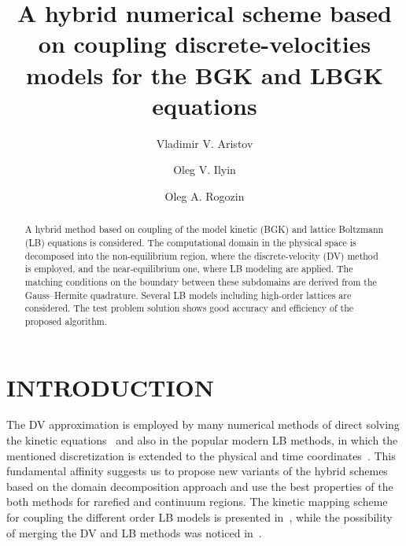 \documentclass{aip-cp}
\begin{document}
\title{A hybrid numerical scheme based on coupling discrete-velocities models for the BGK and LBGK equations}

\author[aff2]{Vladimir V. Aristov}
\author[aff2]{Oleg V. Ilyin}
\author[aff1,aff2]{Oleg A. Rogozin}




\maketitle


\begin{abstract}
A hybrid method based on coupling of the model kinetic (BGK) and lattice Boltzmann (LB) equations is considered.
The computational domain in the physical space is decomposed
into the non-equilibrium region, where the discrete-velocity (DV) method is employed,
and the near-equilibrium one, where LB modeling are applied.
The matching conditions on the boundary between these subdomains are derived from the Gauss--Hermite quadrature.
Several LB models including high-order lattices are considered.
The test problem solution shows good accuracy and efficiency of the proposed algorithm.
\end{abstract}

\section{INTRODUCTION}\label{sec:intro}

The DV approximation is employed by many numerical methods of direct solving the kinetic equations~\cite{Cercignani2000}
and also in the popular modern LB methods, in which the mentioned discretization is extended to the physical and
time coordinates~\cite{Succi2018}. This fundamental affinity suggests us to propose new variants of the hybrid schemes
based on the domain decomposition approach and use the best properties of the both methods for rarefied and continuum regions.
The kinetic mapping scheme for coupling the different order LB models is presented in~\cite{Meng2011},
while the possibility of merging the DV and LB methods was noticed in~\cite{Succi2016}.
\end{document}
